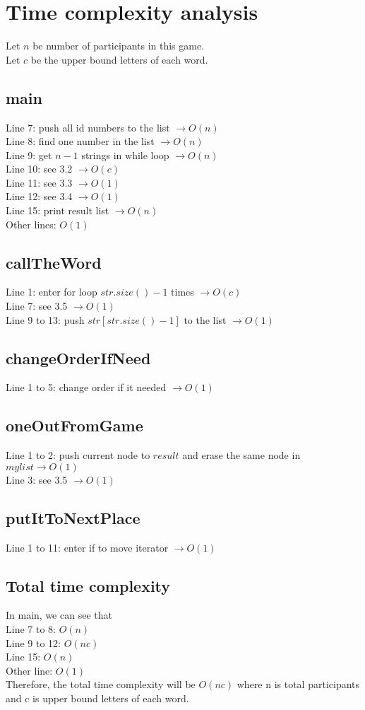 \documentclass[12pt]{article}%
\begin{document}
\section{Time complexity analysis}%
Let $n$ be number of participants in this game.\\
Let $c$ be the upper bound letters of each word.
\subsection{main}
Line 7: push all id numbers to the list $\rightarrow O(n)$\\
Line 8: find one number in the list $\rightarrow O(n)$\\
Line 9: get $n-1$ strings in while loop $\rightarrow O(n)$\\
Line 10: see 3.2 $\rightarrow O(c)$\\
Line 11: see 3.3 $\rightarrow O(1)$\\
Line 12: see 3.4 $\rightarrow O(1)$\\
Line 15: print result list $\rightarrow O(n)$\\
Other lines: $O(1)$
\subsection{callTheWord}
Line 1: enter for loop $str.size()-1$ times $\rightarrow O(c)$\\
Line 7: see 3.5 $\rightarrow O(1)$\\
Line 9 to 13: push $str[str.size()-1]$ to the list $\rightarrow O(1)$
\subsection{changeOrderIfNeed}
Line 1 to 5: change order if it needed $\rightarrow O(1)$
\subsection{oneOutFromGame}
Line 1 to 2: push current node to $result$ and erase the same node in $mylist\rightarrow O(1)$\\
Line 3: see 3.5 $\rightarrow O(1)$
\subsection{putItToNextPlace}
Line 1 to 11: enter if to move iterator $\rightarrow O(1)$
\subsection{Total time complexity}
In main, we can see that\\
Line 7 to 8: $O(n)$\\
Line 9 to 12: $O(nc)$\\
Line 15: $O(n)$\\
Other line: $O(1)$\\
Therefore, the total time complexity will be $O(nc)$ where n is total participants and c is upper bound letters of each word.%
\end{document}

